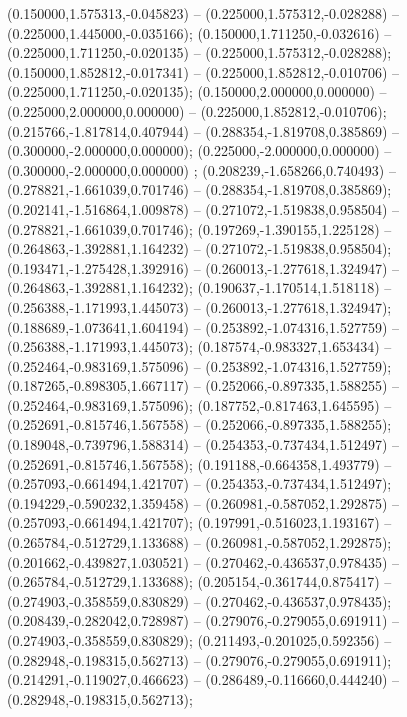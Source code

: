  (0.150000,1.575313,-0.045823) -- (0.225000,1.575312,-0.028288) -- (0.225000,1.445000,-0.035166);
 (0.150000,1.711250,-0.032616) -- (0.225000,1.711250,-0.020135) -- (0.225000,1.575312,-0.028288);
 (0.150000,1.852812,-0.017341) -- (0.225000,1.852812,-0.010706) -- (0.225000,1.711250,-0.020135);
 (0.150000,2.000000,0.000000) -- (0.225000,2.000000,0.000000) -- (0.225000,1.852812,-0.010706);
 (0.215766,-1.817814,0.407944) -- (0.288354,-1.819708,0.385869) -- (0.300000,-2.000000,0.000000);
 (0.225000,-2.000000,0.000000) -- (0.300000,-2.000000,0.000000) ;
 (0.208239,-1.658266,0.740493) -- (0.278821,-1.661039,0.701746) -- (0.288354,-1.819708,0.385869);
 (0.202141,-1.516864,1.009878) -- (0.271072,-1.519838,0.958504) -- (0.278821,-1.661039,0.701746);
 (0.197269,-1.390155,1.225128) -- (0.264863,-1.392881,1.164232) -- (0.271072,-1.519838,0.958504);
 (0.193471,-1.275428,1.392916) -- (0.260013,-1.277618,1.324947) -- (0.264863,-1.392881,1.164232);
 (0.190637,-1.170514,1.518118) -- (0.256388,-1.171993,1.445073) -- (0.260013,-1.277618,1.324947);
 (0.188689,-1.073641,1.604194) -- (0.253892,-1.074316,1.527759) -- (0.256388,-1.171993,1.445073);
 (0.187574,-0.983327,1.653434) -- (0.252464,-0.983169,1.575096) -- (0.253892,-1.074316,1.527759);
 (0.187265,-0.898305,1.667117) -- (0.252066,-0.897335,1.588255) -- (0.252464,-0.983169,1.575096);
 (0.187752,-0.817463,1.645595) -- (0.252691,-0.815746,1.567558) -- (0.252066,-0.897335,1.588255);
 (0.189048,-0.739796,1.588314) -- (0.254353,-0.737434,1.512497) -- (0.252691,-0.815746,1.567558);
 (0.191188,-0.664358,1.493779) -- (0.257093,-0.661494,1.421707) -- (0.254353,-0.737434,1.512497);
 (0.194229,-0.590232,1.359458) -- (0.260981,-0.587052,1.292875) -- (0.257093,-0.661494,1.421707);
 (0.197991,-0.516023,1.193167) -- (0.265784,-0.512729,1.133688) -- (0.260981,-0.587052,1.292875);
 (0.201662,-0.439827,1.030521) -- (0.270462,-0.436537,0.978435) -- (0.265784,-0.512729,1.133688);
 (0.205154,-0.361744,0.875417) -- (0.274903,-0.358559,0.830829) -- (0.270462,-0.436537,0.978435);
 (0.208439,-0.282042,0.728987) -- (0.279076,-0.279055,0.691911) -- (0.274903,-0.358559,0.830829);
 (0.211493,-0.201025,0.592356) -- (0.282948,-0.198315,0.562713) -- (0.279076,-0.279055,0.691911);
 (0.214291,-0.119027,0.466623) -- (0.286489,-0.116660,0.444240) -- (0.282948,-0.198315,0.562713);
